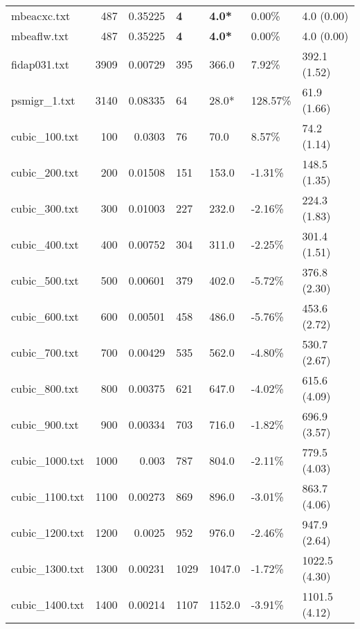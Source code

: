 \begin{table}[h]
\begin{tabular}{lrrllll}
 mbeacxc.txt        &     487 &     0.35225 & \textbf{4}   & \textbf{4.0*}   & 0.00\%   & 4.0 (0.00)     \\
 mbeaflw.txt        &     487 &     0.35225 & \textbf{4}   & \textbf{4.0*}   & 0.00\%   & 4.0 (0.00)     \\
 fidap031.txt       &    3909 &     0.00729 & 395          & 366.0           & 7.92\%   & 392.1 (1.52)   \\
 psmigr_1.txt       &    3140 &     0.08335 & 64           & 28.0*           & 128.57\% & 61.9 (1.66)    \\
 cubic_100.txt      &     100 &     0.0303  & 76           & 70.0            & 8.57\%   & 74.2 (1.14)    \\
 cubic_200.txt      &     200 &     0.01508 & 151          & 153.0           & -1.31\%  & 148.5 (1.35)   \\
 cubic_300.txt      &     300 &     0.01003 & 227          & 232.0           & -2.16\%  & 224.3 (1.83)   \\
 cubic_400.txt      &     400 &     0.00752 & 304          & 311.0           & -2.25\%  & 301.4 (1.51)   \\
 cubic_500.txt      &     500 &     0.00601 & 379          & 402.0           & -5.72\%  & 376.8 (2.30)   \\
 cubic_600.txt      &     600 &     0.00501 & 458          & 486.0           & -5.76\%  & 453.6 (2.72)   \\
 cubic_700.txt      &     700 &     0.00429 & 535          & 562.0           & -4.80\%  & 530.7 (2.67)   \\
 cubic_800.txt      &     800 &     0.00375 & 621          & 647.0           & -4.02\%  & 615.6 (4.09)   \\
 cubic_900.txt      &     900 &     0.00334 & 703          & 716.0           & -1.82\%  & 696.9 (3.57)   \\
 cubic_1000.txt     &    1000 &     0.003   & 787          & 804.0           & -2.11\%  & 779.5 (4.03)   \\
 cubic_1100.txt     &    1100 &     0.00273 & 869          & 896.0           & -3.01\%  & 863.7 (4.06)   \\
 cubic_1200.txt     &    1200 &     0.0025  & 952          & 976.0           & -2.46\%  & 947.9 (2.64)   \\
 cubic_1300.txt     &    1300 &     0.00231 & 1029         & 1047.0          & -1.72\%  & 1022.5 (4.30)  \\
 cubic_1400.txt     &    1400 &     0.00214 & 1107         & 1152.0          & -3.91\%  & 1101.5 (4.12)  \\

\end{tabular}
\end{table}

